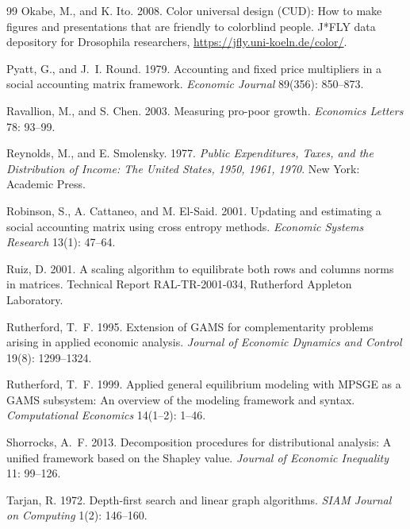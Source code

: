 \begin{thebibliography}{99}
Okabe, M., and K. Ito. 2008.
\newblock Color universal design (CUD): How to make figures and presentations
  that are friendly to colorblind people.
\newblock J*FLY data depository for Drosophila researchers,
  \url{https://jfly.uni-koeln.de/color/}.

Pyatt, G., and J.~I. Round. 1979.
\newblock Accounting and fixed price multipliers in a social accounting
  matrix framework.
\newblock \emph{Economic Journal} 89(356): 850--873.

Ravallion, M., and S. Chen. 2003.
\newblock Measuring pro-poor growth.
\newblock \emph{Economics Letters} 78: 93--99.

Reynolds, M., and E. Smolensky. 1977.
\newblock \emph{Public Expenditures, Taxes, and the Distribution of Income: The
  United States, 1950, 1961, 1970}.
\newblock New York: Academic Press.

Robinson, S., A. Cattaneo, and M. El-Said. 2001.
\newblock Updating and estimating a social accounting matrix using cross
  entropy methods.
\newblock \emph{Economic Systems Research} 13(1): 47--64.

Ruiz, D. 2001.
\newblock A scaling algorithm to equilibrate both rows and columns norms in
  matrices.
\newblock Technical Report RAL-TR-2001-034, Rutherford Appleton Laboratory.

Rutherford, T.~F. 1995.
\newblock Extension of {GAMS} for complementarity problems arising in applied
  economic analysis.
\newblock \emph{Journal of Economic Dynamics and Control} 19(8): 1299--1324.

Rutherford, T.~F. 1999.
\newblock Applied general equilibrium modeling with MPSGE as a GAMS subsystem:
  An overview of the modeling framework and syntax.
\newblock \emph{Computational Economics} 14(1--2): 1--46.

Shorrocks, A.~F. 2013.
\newblock Decomposition procedures for distributional analysis: A unified
  framework based on the {Shapley} value.
\newblock \emph{Journal of Economic Inequality} 11: 99--126.

Tarjan, R. 1972.
\newblock Depth-first search and linear graph algorithms.
\newblock \emph{SIAM Journal on Computing} 1(2): 146--160.


\end{thebibliography}
